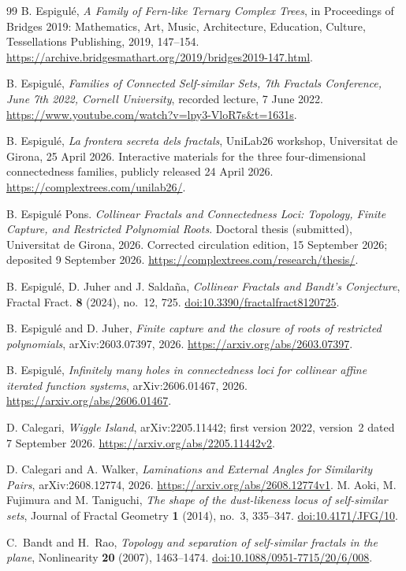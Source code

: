 \begin{thebibliography}{99}
B. Espigul\'e, \emph{A Family of Fern-like Ternary Complex Trees},
in Proceedings of Bridges 2019: Mathematics, Art, Music, Architecture,
Education, Culture, Tessellations Publishing, 2019, 147--154.
\url{https://archive.bridgesmathart.org/2019/bridges2019-147.html}.

B. Espigul\'e,
\emph{Families of Connected Self-similar Sets, 7th Fractals Conference,
June 7th 2022, Cornell University}, recorded lecture, 7 June 2022.
\url{https://www.youtube.com/watch?v=lpy3-VloR7s&t=1631s}.

B. Espigul\'e, \emph{La frontera secreta dels fractals}, UniLab26 workshop,
Universitat de Girona, 25 April 2026. Interactive materials for the
three four-dimensional connectedness families, publicly released 24 April 2026.
\url{https://complextrees.com/unilab26/}.

B. Espigul\'e Pons.
\emph{Collinear Fractals and Connectedness Loci: Topology, Finite Capture, and
Restricted Polynomial Roots}.
Doctoral thesis (submitted), Universitat de Girona, 2026.
Corrected circulation edition, 15 September 2026; deposited 9 September 2026.
\url{https://complextrees.com/research/thesis/}.

B. Espigul\'e, D. Juher and J. Salda\~na,
\emph{Collinear Fractals and Bandt's Conjecture},
Fractal Fract. \textbf{8} (2024), no.~12, 725.
\href{https://doi.org/10.3390/fractalfract8120725}{doi:10.3390/fractalfract8120725}.

B. Espigul\'e and D. Juher,
\emph{Finite capture and the closure of roots of restricted polynomials},
arXiv:2603.07397, 2026.
\url{https://arxiv.org/abs/2603.07397}.

B. Espigul\'e,
\emph{Infinitely many holes in connectedness loci for collinear affine
iterated function systems}, arXiv:2606.01467, 2026.
\url{https://arxiv.org/abs/2606.01467}.

D. Calegari, \emph{Wiggle Island}, arXiv:2205.11442;
first version 2022, version~2 dated 7 September 2026.
\url{https://arxiv.org/abs/2205.11442v2}.

D. Calegari and A. Walker,
\emph{Laminations and External Angles for Similarity Pairs},
arXiv:2608.12774, 2026.
\url{https://arxiv.org/abs/2608.12774v1}.
M. Aoki, M. Fujimura and M. Taniguchi,
\emph{The shape of the dust-likeness locus of self-similar sets},
Journal of Fractal Geometry \textbf{1} (2014), no.~3, 335--347.
\href{https://doi.org/10.4171/JFG/10}{doi:10.4171/JFG/10}.

C.~Bandt and H.~Rao,
\emph{Topology and separation of self-similar fractals in the plane},
Nonlinearity \textbf{20} (2007), 1463--1474.
\href{https://doi.org/10.1088/0951-7715/20/6/008}{doi:10.1088/0951-7715/20/6/008}.

\end{thebibliography}
